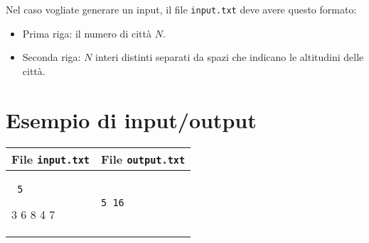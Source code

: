 \documentclass[a4paper,11pt]{article}
\newcommand{\file}[1]{\texttt{#1}}
\newcommand{\esempio}[2]{
\noindent\begin{minipage}{\textwidth}
\begin{tabular}{|p{11cm}|p{5cm}|}
    \hline
    \textbf{File \file{input.txt}} & \textbf{File \file{output.txt}}\\
    \hline
    \tt \small #1 &
    \tt \small #2 \\
    \hline
\end{tabular}
\end{minipage}
}
\begin{document}
Nel caso vogliate generare un input, il file \file{input.txt} deve
avere questo formato:
\begin{itemize}
\item Prima riga: il numero di città $N$.
\item Seconda riga: $N$ interi distinti separati da spazi che indicano
  le altitudini delle città.
\end{itemize}

\section*{Esempio di input/output}

\esempio{
5

3 6 8 4 7

}{5 16}
\end{document}
